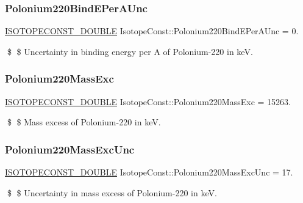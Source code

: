 \subsubsection{\texorpdfstring{Polonium220\+Bind\+E\+Per\+A\+Unc}{Polonium220BindEPerAUnc}}
{\footnotesize\ttfamily \mbox{\hyperlink{group___isotope_const-_macros_ga8f45a7272ce02c0b4c65c44636ed719a}{I\+S\+O\+T\+O\+P\+E\+C\+O\+N\+S\+T\+\_\+\+D\+O\+U\+B\+LE}} Isotope\+Const\+::\+Polonium220\+Bind\+E\+Per\+A\+Unc = 0.}

\$ \$ Uncertainty in binding energy per A of Polonium-\/220 in keV. \mbox{\label{group___isotope_const-_polonium-_po220_gacac60198ab0485112fd8f67bfff166ca}} 
\subsubsection{\texorpdfstring{Polonium220\+Mass\+Exc}{Polonium220MassExc}}
{\footnotesize\ttfamily \mbox{\hyperlink{group___isotope_const-_macros_ga8f45a7272ce02c0b4c65c44636ed719a}{I\+S\+O\+T\+O\+P\+E\+C\+O\+N\+S\+T\+\_\+\+D\+O\+U\+B\+LE}} Isotope\+Const\+::\+Polonium220\+Mass\+Exc = 15263.}

\$ \$ Mass excess of Polonium-\/220 in keV. \mbox{\label{group___isotope_const-_polonium-_po220_ga11499687a660815f87d947ce8569d3f1}} 
\subsubsection{\texorpdfstring{Polonium220\+Mass\+Exc\+Unc}{Polonium220MassExcUnc}}
{\footnotesize\ttfamily \mbox{\hyperlink{group___isotope_const-_macros_ga8f45a7272ce02c0b4c65c44636ed719a}{I\+S\+O\+T\+O\+P\+E\+C\+O\+N\+S\+T\+\_\+\+D\+O\+U\+B\+LE}} Isotope\+Const\+::\+Polonium220\+Mass\+Exc\+Unc = 17.}

\$ \$ Uncertainty in mass excess of Polonium-\/220 in keV. \mbox{\label{group___isotope_const-_polonium-_po220_ga46f44e92683d356a4b3330a18994a6d1}} 
